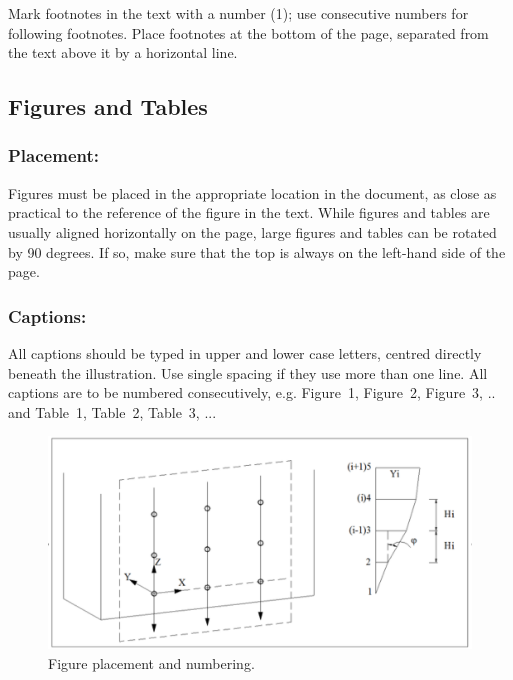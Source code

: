 \documentclass{isprs} %
\begin{document}
Mark footnotes in the text with a number (1); use consecutive numbers for following footnotes. Place footnotes at the bottom of the page, separated from the text above it by a horizontal line.


\subsection{Figures and Tables}\label{sec:Illustrations and Tables}

\subsubsection{Placement:}\label{sec:Placement}

Figures must be placed in the appropriate location in the document, as close as practical to the reference of the figure in the text. While figures and tables are usually aligned horizontally on the page, large figures and tables can be rotated by 90 degrees. If so, make sure that the top is always on the left-hand side of the page.

\subsubsection{Captions:}\label{sec:Captions}

All captions should be typed in upper and lower case letters, 
centred directly beneath the illustration. Use single spacing if they 
use more than one line. All captions are to be numbered consecutively, 
e.g. Figure~1, Figure~2, Figure~3, ..  and Table~1, Table~2, Table~3, ...

\begin{figure}[ht!]
\begin{center}
		\includegraphics[width=1.0\columnwidth]{figures/test_sites/fig1.eps}
	\caption{Figure placement and numbering.}
\label{fig:figure_placement}
\end{center}
\end{figure}
\end{document}
